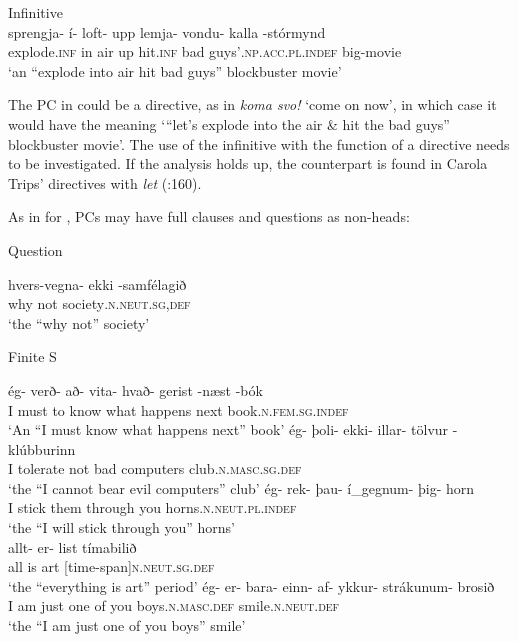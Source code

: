 \documentclass[output=paper]{LSP/langsci}
\begin{document}
\begin{xlist}
\ea%
 \label{ex:bjarnadottir:29} Infinitive\\
 \gll sprengja- í- loft- upp lemja- vondu- kalla -stórmynd\\
 explode\textsc{.inf} in air up hit\textsc{.inf} bad guys’\textsc{.np.acc.pl.indef}  big-movie\\
\glt ‘an “explode into air hit bad guys” blockbuster movie’
\z

The PC in  could be a directive, as in \textit{koma svo!} ‘come on now’, in which case it would have the meaning ‘“let’s explode into the air \& hit the bad guys” blockbuster movie’. The use of the infinitive with the function of a directive needs to be investigated. If the analysis holds up, the counterpart is found in Carola Trips’ directives with \textit{let} (\citeyear{Trips2016}:160).

As in \citet[159--160]{Trips2016} for ,  PCs may have full clauses and questions as non-heads:  

\ea%
 \label{ex:bjarnadottir:30} 
 \begin{xlist}
  Question 
\begin{xlist}
\gll  hvers-vegna- ekki -samfélagið\\
 why not society\textsc{.n.neut.sg,def}\\
\glt ‘the “why not” society’
\end{xlist}
 Finite S 
\begin{xlist}
\gll ég- verð- að- vita- hvað- gerist -næst -bók\\
 I must to know what happens next book\textsc{.n.fem.sg.indef}\\
\glt ‘An “I must know what happens next” book’ 
\gll ég- þoli- ekki- illar- tölvur -klúbburinn\\
 I tolerate not bad computers club\textsc{.n.masc.sg.def}\\
\glt ‘the “I cannot bear evil computers” club’
 \gll ég- rek- þau- í\_gegnum- þig- horn\\
 I stick them through you horns\textsc{.n.neut.pl.indef}\\
\glt `the ``I will stick through you'' horns'\\
\gll allt- er- list tímabilið\\
 all is  art [time-span]\textsc{n.neut.sg.def}\\
\glt ‘the “everything is art” period’
\gll  ég- er- bara- einn- af- ykkur- strákunum- brosið\\
 I am just one of you boys\textsc{.n.masc.def} smile\textsc{.n.neut.def}$\!\!$\\
\glt ‘the “I am just one of you boys” smile’
\end{xlist}
\end{xlist}
\z


\end{xlist}
\end{document}
